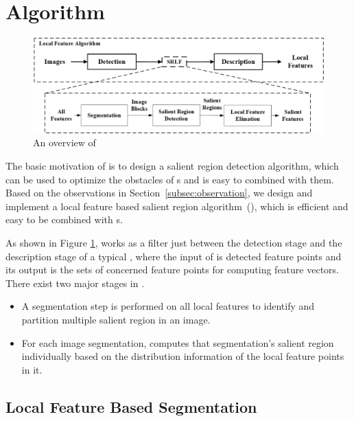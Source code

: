 \section{{\sys} Algorithm}
\label{sec:algorithm}


\begin{figure}[!ht]
\centering
\includegraphics[width=4.5in]{images/fig-overview.eps}
\caption{An overview of {\sys}}
\label{fig:overview}
\end{figure}

The basic motivation of {\sys} is to design a salient region detection algorithm, which can be used to optimize the obstacles of {\lfea}s and is easy to combined with them. Based on the observations in Section~\ref{subsec:observation}, we design and implement a local feature based salient region algorithm~({\sys}), which is efficient and easy to be combined with {\lfea}s.

As shown in Figure \ref{fig:overview}, {\sys} works as a filter just between the detection stage and the description stage of a typical {\lfea}, where the input of {\sys} is detected feature points and its output is the sets of concerned feature points for computing feature vectors. There exist two major stages in {\sys}.
\begin{itemize}
\item A segmentation step is performed on all local features to identify and partition multiple salient region in an image.
\item For each image segmentation, {\sys} computes that segmentation's salient region individually based on the distribution information of the local feature points in it.
\end{itemize}


\subsection{Local Feature Based Segmentation}
\label{sec:algorithm_segmentation}

